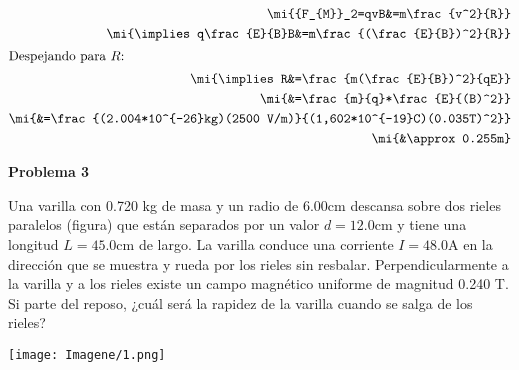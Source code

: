 \documentclass[a4paper,12pt]{article}
\begin{document}
\begin{center}
    


\end{center}

\begin{align}
    \mi{{F_{M}}_2=qvB&=m\frac{v^2}{R}}\\
    \mi{\implies q\frac{E}{B}B&=m\frac{(\frac{E}{B})^2}{R}}\\
    \intertext{Despejando para $R$:}
    \mi{\implies R&=\frac{m(\frac{E}{B})^2}{qE}}\\
    \mi{&=\frac{m}{q}*\frac{E}{(B)^2}}\\
    \mi{&=\frac{(2.004*10^{-26}kg)(2500 V/m)}{(1,602*10^{-19}C)(0.035T)^2}}\\
    \mi{&\approx 0.255m}
\end{align}



\textbf{Problema 3}

Una varilla con 0.720 kg de masa y un radio de $6.00 \mathrm{cm}$ descansa sobre dos rieles paralelos (figura) que están separados por un valor $d=12.0 \mathrm{cm}$ y tiene una longitud $L=45.0 \mathrm{cm}$ de largo. La varilla conduce una corriente $I=48.0 \mathrm{A}$ en la dirección que se muestra y rueda por los rieles sin resbalar. Perpendicularmente a la varilla y a los rieles existe un campo magnético uniforme de magnitud 0.240 T. Si parte del reposo, ¿cuál será la rapidez de la varilla cuando se salga de los rieles?\\
\begin{center}
\texttt{[image: Imagene/1.png]}
\end{center}
\end{document}
